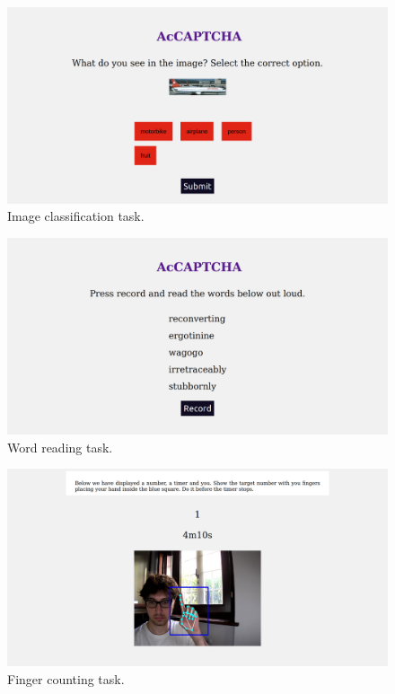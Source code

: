 \begin{figure}[h!t]
    \centering
    \includegraphics[scale=0.17]{assets/images/image_classification.png}
    \caption{Image classification task.}
    \label{fig:gui:image_classification}
\end{figure}

\begin{figure}[h!t]
    \centering
    \includegraphics[scale=0.17]{assets/images/word_reading.png}
    \caption{Word reading task.}
    \label{fig:gui:word_reading}
\end{figure}

\begin{figure}[h!t]
    \centering
    \includegraphics[scale=0.17]{assets/images/finger_count.png}
    \caption{Finger counting task.}
    \label{fig:gui:finger_count}
\end{figure}

